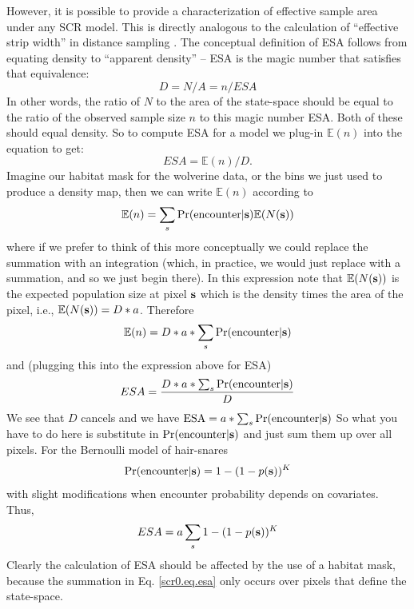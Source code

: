 {However, it is possible to provide a characterization of effective
sample area under any SCR model.
This is directly
analogous to the calculation of ``effective strip width'' in distance
sampling \citep{buckland_etal:2001, borchers_etal:2002}.
The conceptual definition of ESA follows from equating density to
``apparent density'' -- ESA is the magic number that satisfies that equivalence:
\[
 D = N/A   = n/ESA
\]
In other words, the ratio of $N$ to the area of the state-space should be
equal to the ratio of the observed sample size $n$ to this magic
number
ESA. Both of these should equal density.
So to compute ESA for a model we  plug-in $\mathbb{E}(n)$ into the equation to get:
\[
 ESA = \mathbb{E}(n)/D.
\]
Imagine our habitat mask for the wolverine data, or the bins we just
used to produce a density map, then we can write $\mathbb{E}(n)$
according to
\[
\mathbb{E}(n) = \sum_{s}  \Pr(\mbox{encounter} | {\bf s}) \mathbb{E}(N({\bf s}) )
\]
where if we prefer to think of this more conceptually we could replace
the summation with an integration (which, in practice, we would just
replace with a summation, and so we just begin there).
In this expression note that
$\mathbb{E}(N({\bf s}))$ is the expected population size at pixel
${\bf s}$  which is the
density times the area of the pixel, i.e., $\mathbb{E}(N({\bf s}))=
D*a$.
Therefore
\[
 \mathbb{E}(n) = D*a* \sum_{s} \Pr(\mbox{encounter} | {\bf s})
\]
and (plugging this into the expression above for ESA)
\[
 ESA = \frac{D*a*\sum_{s} \Pr(\mbox{encounter} | {\bf s}) }{D}
\]
We see that $D$ cancels and we have
$\mbox{ESA} = a*\sum_{s} \Pr(\mbox{encounter} | {\bf s})$
So what you have to do here is substitute in $\Pr(\mbox{encounter}|
{\bf s})$ and just sum them up over all pixels.  For the Bernoulli model of hair-snares
\[
\Pr(\mbox{encounter}|{\bf s}) =    1-(1-p({\bf s}))^{K}
\]
with slight modifications when encounter probability depends on
covariates. Thus,
\begin{equation}
ESA = a  \sum_{s}   1-(1-p({\bf s}))^{K}
\label{scr0.eq.esa}
\end{equation}
Clearly the calculation of ESA should be affected by the use of a
habitat mask, because the summation in Eq. \ref{scr0.eq.esa} only occurs over pixels
that define the state-space.

}
